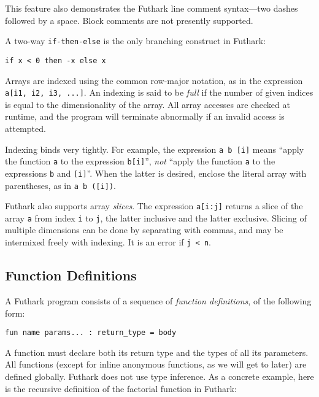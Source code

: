 \documentclass[11pt]{book}
\begin{document}
\noindent
This feature also demonstrates the Futhark line comment syntax---two dashes
followed by a space.  Block comments are not presently supported.

A two-way \texttt{if-then-else} is the only branching construct in
Futhark:

\begin{lstlisting}
if x < 0 then -x else x
\end{lstlisting}

Arrays are indexed using the common row-major notation, as in the expression
\texttt{a[i1, i2, i3, ...]}.  An indexing is said to be \textit{full} if
the number of given indices is equal to the dimensionality of the
array.  All array accesses are checked at runtime, and the program
will terminate abnormally if an invalid access is attempted.

Indexing binds very tightly.  For example, the expression
\texttt{a~b~[i]} means ``apply the function \texttt{a} to the
expression \texttt{b[i]}'', \textit{not} ``apply the function
\texttt{a} to the expressions \texttt{b} and \texttt{[i]}''.  When the
latter is desired, enclose the literal array with parentheses, as in
\texttt{a~b~([i])}.

Futhark also supports array \textit{slices}.  The expression
\texttt{a[i:j]} returns a slice of the array \texttt{a} from index
\texttt{i} to \texttt{j}, the latter inclusive and the latter
exclusive.  Slicing of multiple dimensions can be done by separating
with commas, and may be intermixed freely with indexing.  It is an
error if \texttt{j < n}.

\subsection{Function Definitions}
\label{sec:function-declarations}

A Futhark program consists of a sequence of \textit{function
  definitions}, of the following form:

\begin{lstlisting}
fun name params... : return_type = body
\end{lstlisting}

\noindent
A function must declare both its return type and the types of all its
parameters.  All functions (except for inline anonymous functions, as
we will get to later) are defined globally.  Futhark does not use type
inference.  As a concrete example, here is the recursive definition of
the factorial function in Futhark:
\end{document}
